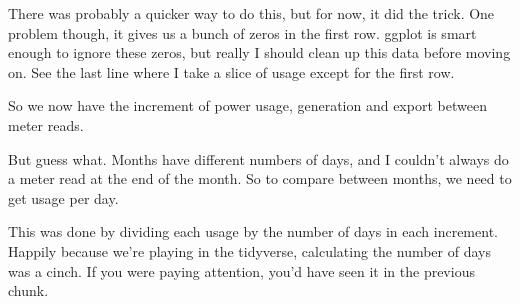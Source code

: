\documentclass[]{article}
\newenvironment{Shaded}{\begin{snugshade}}{\end{snugshade}}
\newcommand{\KeywordTok}[1]{\textcolor[rgb]{0.13,0.29,0.53}{\textbf{#1}}}
\newcommand{\DataTypeTok}[1]{\textcolor[rgb]{0.13,0.29,0.53}{#1}}
\newcommand{\DecValTok}[1]{\textcolor[rgb]{0.00,0.00,0.81}{#1}}
\newcommand{\StringTok}[1]{\textcolor[rgb]{0.31,0.60,0.02}{#1}}
\newcommand{\OperatorTok}[1]{\textcolor[rgb]{0.81,0.36,0.00}{\textbf{#1}}}
\newcommand{\NormalTok}[1]{#1}
\begin{document}
\begin{Shaded}
\begin{Highlighting}[]
{{{{{{\NormalTok{usage <-}\StringTok{ }\NormalTok{usage }\OperatorTok{%>%}\StringTok{ }
\StringTok{  }\KeywordTok{mutate}\NormalTok{(}\DataTypeTok{days =} \KeywordTok{as.integer}\NormalTok{(date }\OperatorTok{-}
\StringTok{           }\KeywordTok{lag}\NormalTok{(date, }\DataTypeTok{default =} \KeywordTok{first}\NormalTok{(date))))}

\NormalTok{usage <-}\StringTok{ }\KeywordTok{slice}\NormalTok{(usage, }\OperatorTok{-}\DecValTok{1}\NormalTok{)}
\end{Highlighting}
\end{Shaded}

There was probably a quicker way to do this, but for now, it did the
trick. One problem though, it gives us a bunch of zeros in the first
row. ggplot is smart enough to ignore these zeros, but really I should
clean up this data before moving on. See the last line where I take a
slice of usage except for the first row.

So we now have the increment of power usage, generation and export
between meter reads.

But guess what. Months have different numbers of days, and I couldn't
always do a meter read at the end of the month. So to compare between
months, we need to get usage per day.

This was done by dividing each usage by the number of days in each
increment. Happily because we're playing in the tidyverse, calculating
the number of days was a cinch. If you were paying attention, you'd have
seen it in the previous chunk.
\end{document}
